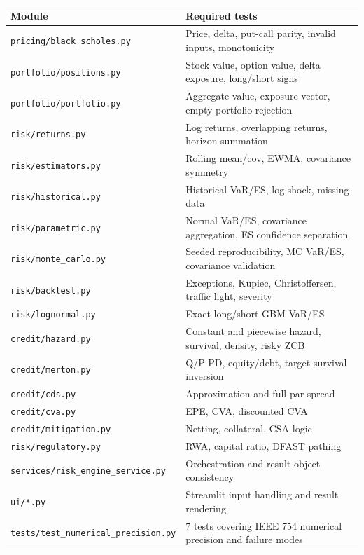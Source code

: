 \documentclass[11pt]{article}
\newcommand{\code}[1]{\texttt{#1}}
\begin{document}
\begin{center}
\small
\begin{tabular}{L{6.2cm}L{7.5cm}}
\toprule
\textbf{Module} & \textbf{Required tests} \\
\midrule
\code{pricing/black\_scholes.py}          & Price, delta, put-call parity, invalid inputs, monotonicity \\
\code{portfolio/positions.py}             & Stock value, option value, delta exposure, long/short signs \\
\code{portfolio/portfolio.py}             & Aggregate value, exposure vector, empty portfolio rejection \\
\code{risk/returns.py}                    & Log returns, overlapping returns, horizon summation \\
\code{risk/estimators.py}                 & Rolling mean/cov, EWMA, covariance symmetry \\
\code{risk/historical.py}                 & Historical VaR/ES, log shock, missing data \\
\code{risk/parametric.py}                 & Normal VaR/ES, covariance aggregation, ES confidence separation \\
\code{risk/monte\_carlo.py}               & Seeded reproducibility, MC VaR/ES, covariance validation \\
\code{risk/backtest.py}                   & Exceptions, Kupiec, Christoffersen, traffic light, severity \\
\code{risk/lognormal.py}                  & Exact long/short GBM VaR/ES \\
\code{credit/hazard.py}                   & Constant and piecewise hazard, survival, density, risky ZCB \\
\code{credit/merton.py}                   & Q/P PD, equity/debt, target-survival inversion \\
\code{credit/cds.py}                      & Approximation and full par spread \\
\code{credit/cva.py}                      & EPE, CVA, discounted CVA \\
\code{credit/mitigation.py}               & Netting, collateral, CSA logic \\
\code{risk/regulatory.py}                 & RWA, capital ratio, DFAST pathing \\
\code{services/risk\_engine\_service.py}  & Orchestration and result-object consistency \\
\code{ui/*.py}                            & Streamlit input handling and result rendering \\
\code{tests/test\_numerical\_precision.py}& 7 tests covering IEEE 754 numerical precision and failure modes \\
\bottomrule
\end{tabular}
\end{center}
\end{document}
